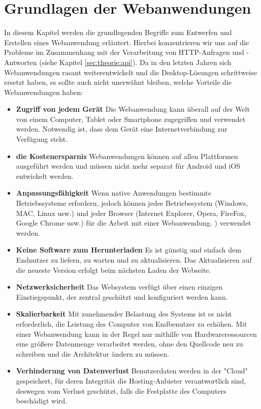 \section{Grundlagen der Webanwendungen}
\label{sec:theorie:webapp}
In diesem Kapitel werden die grundlegenden Begriffe zum Entwerfen und Erstellen eines Webanwendung erläutert. Hierbei konzentrieren wir uns auf die Probleme im Zusammenhang mit der Verarbeitung von HTTP-Anfragen und -Antworten (siehe Kapitel \ref{sec:theorie:api}). Da in den letzten Jahren sich Webanwendungen rasant weiterentwickelt und die Desktop-Lösungen schrittweise ersetzt haben, es sollte auch nicht unerwähnt bleiben, welche Vorteile die Webanwendungen haben:
\begin{itemize}
	\item \textbf{Zugriff von jedem Gerät} Die Webanwendung kann überall auf der Welt von einem Computer, Tablet oder Smartphone zugegriffen und verwendet werden. Notwendig ist, dass dem Gerät eine Internetverbindung zur Verfügung steht.
	
	\item \textbf{die Kostenersparnis} Webanwendungen können auf allen Plattformen ausgeführt werden und müssen nicht mehr separat für Android und iOS entwickelt werden.
	
	\item \textbf{Anpassungsfähigkeit} Wenn native Anwendungen bestimmte Betriebssysteme erfordern, jedoch können jedes Betriebssystem (Windows, MAC, Linux usw.) und jeder Browser (Internet Explorer, Opera, FireFox, Google Chrome usw.) für die Arbeit mit einer Webanwendung. ) verwendet werden.
	
	\item \textbf{Keine Software zum Herunterladen} Es ist günstig und einfach dem Endnutzer zu liefern, zu warten und zu aktualisieren. Das Aktualisieren auf die neueste Version erfolgt beim nächsten Laden der Webseite.
	
	\item \textbf{Netzwerksicherheit} Das Websystem verfügt über einen einzigen Einstiegspunkt, der zentral geschützt und konfiguriert werden kann.
	
	\item \textbf{Skalierbarkeit} Mit zunehmender Belastung des Systems ist es nicht erforderlich, die Leistung des Computer von Endbenutzer zu erhöhen. Mit einer Webanwendung kann in der Regel nur mithilfe von Hardwareressourcen eine größere Datenmenge verarbeitet werden, ohne den Quellcode neu zu schreiben und die Architektur ändern zu müssen.
	
	\item \textbf{Verhinderung von Datenverlust} Benutzerdaten werden in der "Cloud" gespeichert, für deren Integrität die Hosting-Anbieter verantwortlich sind, deswegen vom Verlust geschützt, falls die Festplatte des Computers beschädigt wird.
\end{itemize}

